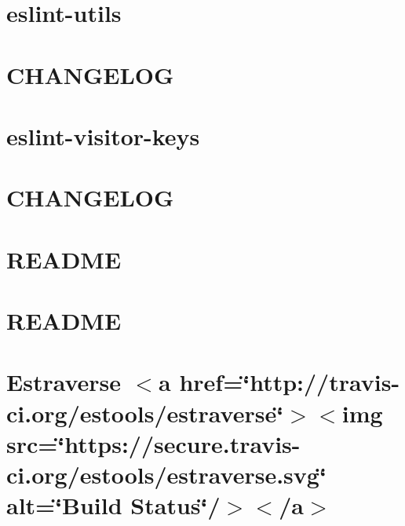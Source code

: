 \let\mypdfximage\pdfximage\def\pdfximage{\immediate\mypdfximage}\documentclass[twoside]{book}
\newcommand{\+}{\discretionary{\mbox{\scriptsize$\hookleftarrow$}}{}{}}
\begin{document}
\chapter{eslint-\/utils}
\label{md_heap-visualizer_node_modules_eslint-utils__r_e_a_d_m_e}

\chapter{C\+H\+A\+N\+G\+E\+L\+OG}
\label{md_heap-visualizer_node_modules_eslint-visitor-keys__c_h_a_n_g_e_l_o_g}

\chapter{eslint-\/visitor-\/keys}
\label{md_heap-visualizer_node_modules_eslint-visitor-keys__r_e_a_d_m_e}

\chapter{C\+H\+A\+N\+G\+E\+L\+OG}
\label{md_heap-visualizer_node_modules_espree__c_h_a_n_g_e_l_o_g}

\chapter{R\+E\+A\+D\+ME}
\label{md_heap-visualizer_node_modules_espree__r_e_a_d_m_e}

\chapter{R\+E\+A\+D\+ME}
\label{md_heap-visualizer_node_modules_esprima__r_e_a_d_m_e}

\chapter{Estraverse $<$a href=\char`\"{}http\+://travis-\/ci.\+org/estools/estraverse\char`\"{}$>$$<$img src=\char`\"{}https\+://secure.\+travis-\/ci.\+org/estools/estraverse.\+svg\char`\"{} alt=\char`\"{}\+Build Status\char`\"{}/$>$$<$/a$>$}
\label{md_heap-visualizer_node_modules_esquery_node_modules_estraverse__r_e_a_d_m_e}

\end{document}
